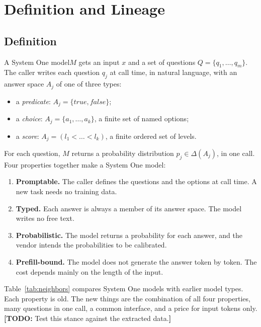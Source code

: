 \documentclass[acmsmall,nonacm,screen]{acmart}
\newcommand{\todo}[1]{{\color{red}\textbf{[TODO: }#1\textbf{]}}}
\newcommand{\sone}{System One model\xspace}
\newcommand{\sones}{System One models\xspace}
\begin{document}
\section{Definition and Lineage}
\label{sec:definition}

\subsection{Definition}
A \sone $M$ gets an input $x$ and a set of questions $Q = \{q_1, \dots, q_m\}$. The caller writes each question $q_j$ at call time, in natural language, with an answer space $A_j$ of one of three types:
\begin{itemize}
  \item a \emph{predicate}: $A_j = \{\mathit{true}, \mathit{false}\}$;
  \item a \emph{choice}: $A_j = \{a_1, \dots, a_k\}$, a finite set of named options;
  \item a \emph{score}: $A_j = (l_1 < \dots < l_k)$, a finite ordered set of levels.
\end{itemize}
For each question, $M$ returns a probability distribution $p_j \in \Delta(A_j)$, in one call. Four properties together make a \sone:
\begin{enumerate}
  \item \textbf{Promptable.} The caller defines the questions and the options at call time. A new task needs no training data.
  \item \textbf{Typed.} Each answer is always a member of its answer space. The model writes no free text.
  \item \textbf{Probabilistic.} The model returns a probability for each answer, and the vendor intends the probabilities to be calibrated.
  \item \textbf{Prefill-bound.} The model does not generate the answer token by token. The cost depends mainly on the length of the input.
\end{enumerate}

Table~\ref{tab:neighbors} compares \sones with earlier model types. Each property is old. The new things are the combination of all four properties, many questions in one call, a common interface, and a price for input tokens only. \todo{Test this stance against the extracted data.}
\end{document}

